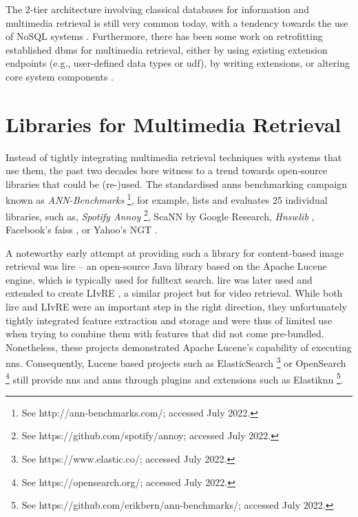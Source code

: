 The 2-tier architecture involving classical databases for information and multimedia retrieval is still very common today, with a tendency towards the use of NoSQL systems \cite{Muhleisen:2014Old,Oliveira:2017Performance}. Furthermore, there has been some work on retrofitting established \acrshort{dbms} for multimedia retrieval, either by using existing extension endpoints (e.g., user-defined data types or \acrfull{udf}), by writing extensions, or altering core system components \cite{Guliato:2009PostgreSQL,Whang:2010Tightly,Giangreco:2014Adam,Fleites:2013Efficient,Whang:2015DB,Yang:2020Pase}.

\section{Libraries for Multimedia Retrieval}
\label{section:nns_libraries}

Instead of tightly integrating multimedia retrieval techniques with systems that use them, the past two decades bore witness to a trend towards open-source libraries that could be (re-)used. The standardised \acrshort{anns} benchmarking campaign known as \emph{ANN-Benchmarks} \cite{Aumueller:2017ANN} \footnote{See http://ann-benchmarks.com/; accessed July 2022.}, for example, lists and evaluates 25 individual libraries, such as, \emph{Spotify Annoy} \footnote{See https://github.com/spotify/annoy; accessed July 2022.}, ScaNN \cite{Guo:2020Accelerating} by Google Research, \emph{Hnswlib} \cite{Malkov:2018Efficient}, Facebook's \acrshort{faiss} \cite{Johnson:2019Billion}, or Yahoo's NGT \cite{Iwasaki2016:Pruned}.

A noteworthy early attempt at providing such a library for content-based image retrieval was \acrfull{lire} \cite{Luc:2008LIRE} -- an open-source Java library based on the Apache Lucene engine, which is typically used for fulltext search. \acrshort{lire} was later used and extended to create LIvRE \cite{Oliveira:2016Large}, a similar project but for video retrieval. While both \acrshort{lire} and LIvRE were an important step in the right direction, they unfortunately tightly integrated feature extraction and storage and were thus of limited use when trying to combine them with features that did not come pre-bundled. Nonetheless, these projects demonstrated Apache Lucene's capability of executing \acrshort{nns}. Consequently, Lucene based projects such as ElasticSearch \footnote{See https://www.elastic.co/; accessed July 2022.} or OpenSearch \footnote{See https://opensearch.org/; accessed July 2022.} still provide \acrshort{nns} and \acrshort{anns} through plugins and extensions such as Elastiknn \footnote{See https://github.com/erikbern/ann-benchmarks/; accessed July 2022.}.

